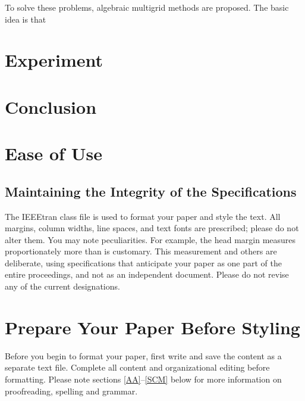 \documentclass[onecolumn, conference]{IEEEtran}
\begin{document}
To solve these problems, algebraic multigrid methods are proposed. The basic idea is that



\section{Experiment}




\section{Conclusion}





















\section{Ease of Use}

\subsection{Maintaining the Integrity of the Specifications}

The IEEEtran class file is used to format your paper and style the text. All margins, 
column widths, line spaces, and text fonts are prescribed; please do not 
alter them. You may note peculiarities. For example, the head margin
measures proportionately more than is customary. This measurement 
and others are deliberate, using specifications that anticipate your paper 
as one part of the entire proceedings, and not as an independent document. 
Please do not revise any of the current designations.

\section{Prepare Your Paper Before Styling}
Before you begin to format your paper, first write and save the content as a 
separate text file. Complete all content and organizational editing before 
formatting. Please note sections \ref{AA}--\ref{SCM} below for more information on 
proofreading, spelling and grammar.
\end{document}

